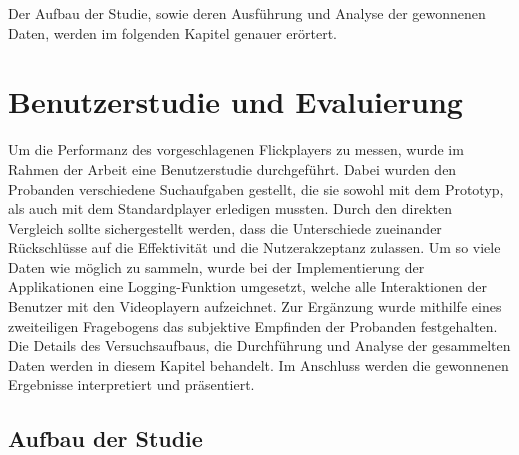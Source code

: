 \documentclass[11pt,a4paper]{report}
\begin{document}
Der Aufbau der Studie, sowie deren Ausführung und Analyse der gewonnenen Daten, werden im folgenden Kapitel genauer erörtert.

\chapter{Benutzerstudie und Evaluierung}

Um die Performanz des vorgeschlagenen Flickplayers zu messen, wurde im Rahmen der Arbeit eine Benutzerstudie durchgeführt. Dabei wurden den Probanden verschiedene Suchaufgaben gestellt, die sie sowohl mit dem Prototyp, als auch mit dem Standardplayer erledigen mussten. Durch den direkten Vergleich sollte sichergestellt werden, dass die Unterschiede zueinander Rückschlüsse auf die Effektivität und die Nutzerakzeptanz zulassen. Um so viele Daten wie möglich zu sammeln, wurde bei der Implementierung der Applikationen eine Logging-Funktion umgesetzt, welche alle Interaktionen der Benutzer mit den Videoplayern aufzeichnet. Zur Ergänzung wurde mithilfe eines zweiteiligen Fragebogens das subjektive Empfinden der Probanden festgehalten. Die Details des Versuchsaufbaus, die Durchführung und Analyse der gesammelten Daten werden in diesem Kapitel behandelt. Im Anschluss werden die gewonnenen Ergebnisse interpretiert und präsentiert.

\section{Aufbau der Studie}
\end{document}
